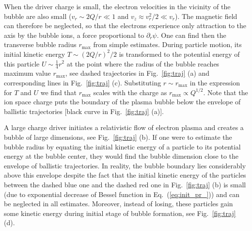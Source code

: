 \documentclass[twocolumn,showpacs,aip]{revtex4}
\begin{document}
When the driver charge is small, the electron velocities  in the vicinity of the bubble are also small ($v_r\sim 2Q/r\ll 1$ and $v_z\approx v_r^2/2\ll v_r$). The magnetic field can therefore be neglected, so that the electrons experience only attraction to the axis by  the bubble ions, a force proportional to $\partial_r \psi$. One can find then the transverse bubble radius $r_{\max}$ from simple  estimates. During particle motion, its initial kinetic energy   $T\sim  (2Q/r)^2/2$ is transformed to the potential energy of this particle $U\sim\frac{1}{4} r^2$ at the point  where the radius of the bubble reaches maximum value $r_{\max}$, see dashed  trajectories in Fig.~\ref{fig:traj} (a) and  corresponding  lines in Fig.~\ref{fig:traj} (c). 
Substituting $r\sim r_{\max}$ in the expression for $T$ and $U$ we find that $r_{\max}$ scales with  the charge as $r_{\max}\propto Q^{1/2}$. Note that the ion space charge puts the boundary of  the plasma bubble   below the 
 envelope of ballistic trajectories [black curve in Fig.~\ref{fig:traj} (a)]. 

A large charge driver initiates a relativistic flow of electron plasma and creates a bubble of large dimensions, see   Fig.~\ref{fig:traj} (b). 
If one were to estimate the bubble radius   by equating the initial kinetic energy of a particle to its potential energy at the bubble center, they would find  the bubble dimension close to the envelope of ballistic trajectories. In reality, the bubble boundary  lies considerably above this envelope %
despite the fact that the initial kinetic energy of the particles  between the dashed blue one  and the dashed red one  in Fig.~\ref{fig:traj} (b) is  small (due to exponential decrease of Bessel function in Eq.~(\ref{eq:init_pr_})) and can be neglected in all estimates. Moreover, instead of losing, these particles gain some kinetic energy during initial stage of bubble formation, see Fig.~\ref{fig:traj} (d). 

\end{document}
